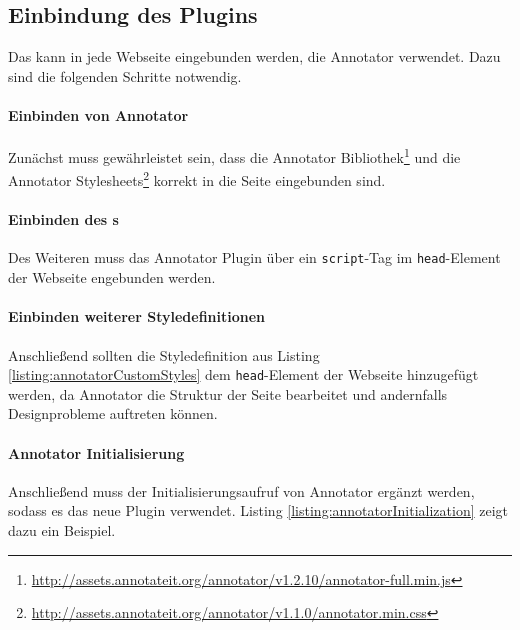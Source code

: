 \subsection{Einbindung des Plugins}
    \label{section:solutionDetailsAnnotatorPluginIntegration}
    Das {\annotatorPlugin} kann in jede Webseite eingebunden werden,
    die Annotator verwendet.
    Dazu sind die folgenden Schritte notwendig.

    \paragraph{Einbinden von Annotator}
    Zunächst muss gewährleistet sein, dass die
    Annotator Bibliothek\footnote{\url{http://assets.annotateit.org/annotator/v1.2.10/annotator-full.min.js}}
    und die Annotator Stylesheets\footnote{\url{http://assets.annotateit.org/annotator/v1.1.0/annotator.min.css}}
    korrekt in die Seite eingebunden sind.

    \paragraph{Einbinden des {\annotatorPlugin}s}
    Des Weiteren muss das Annotator Plugin über ein \texttt{script}-Tag
    im \texttt{head}-Element der Webseite engebunden werden.

    \paragraph{Einbinden weiterer Styledefinitionen}
    Anschließend sollten die Styledefinition aus Listing \ref{listing:annotatorCustomStyles}
    dem \texttt{head}-Element der Webseite hinzugefügt werden,
    da Annotator die Struktur der Seite bearbeitet und andernfalls Designprobleme auftreten können.

    

    \paragraph{Annotator Initialisierung}
    Anschließend muss der Initialisierungsaufruf von Annotator ergänzt werden,
    sodass es das neue Plugin verwendet.
    Listing \ref{listing:annotatorInitialization} zeigt dazu ein Beispiel.

    

